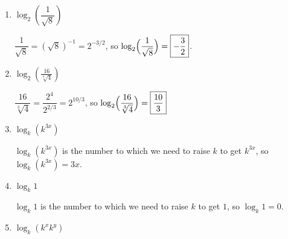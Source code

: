 \documentclass{article}
\begin{document}
\begin{enumerate}
\begin{enumerate}
    \begin{solution}
      $\sqrt{8} = \sqrt{2^3} = 2^{3/2}$, so $\log_2 \sqrt{8} = \boxed{\frac{3}{2}}$.
    \end{solution}

  \item
    \begin{problem}[\vfill]
      $\log_2 \left( \dfrac{1}{\sqrt{8}} \right)$
    \end{problem}

    \begin{solution}
      $\dfrac{1}{\sqrt{8}} = (\sqrt{8})^{-1} = 2^{-3/2}$, so
      $\log_2 \Bigl(\dfrac{1}{\sqrt{8}}\Bigr) = \boxed{-\frac{3}{2}}$.
    \end{solution}

  \item 
    \begin{problem}[\vfill]
      $\displaystyle \log_2\left({\frac{16}{\sqrt[3] 4}} \right)$
    \end{problem}

    \begin{solution}
      $\dfrac{16}{\sqrt[3]{4}} = \dfrac{2^4}{2^{2/3}} = 2^{10/3}$,
      so $\log_2\Bigl(\dfrac{16}{\sqrt[3]{4}}\Bigr) = \boxed{\frac{10}{3}}$
    \end{solution}

  \item
    \begin{problem}[\vfill]
      $\log_k \left( k^{3x} \right)$
    \end{problem}

    \begin{solution}
      $\log_k \left( k^{3x} \right)$ is the number to which we need to
      raise $k$ to get $k^{3x}$, so 
      $\log_k \left( k^{3x} \right)=\boxed{3x}$.
    \end{solution}

  \item
    \begin{problem}[\vfill]
      $ \log_k 1$
    \end{problem}

    \begin{solution}
      $\log_k 1$ is the number to which we need to
      raise $k$ to get $1$, so 
      $\log_k 1=\boxed{0}$.
    \end{solution}

  \item
    \begin{problem}[\vfill\newpage]
      $\log_k (k^x k^y)$
    \end{problem}


\end{enumerate}
\end{enumerate}
\end{document}
